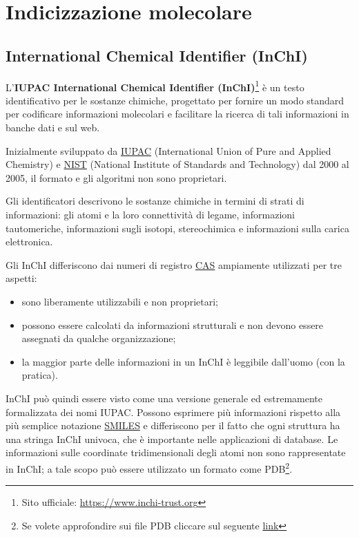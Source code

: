 \chapter{Indicizzazione molecolare}

\section{International Chemical Identifier (InChI)}\label{sec:InChI}
L'\textbf{IUPAC International Chemical Identifier (InChI)}\footnote{Sito ufficiale: \url{https://www.inchi-trust.org}} è un testo identificativo per le sostanze chimiche, progettato per fornire un modo standard per codificare informazioni molecolari e facilitare la ricerca di tali informazioni in banche dati e sul web.

Inizialmente sviluppato da \href{https://iupac.org}{IUPAC}  (International Union of Pure and Applied Chemistry) e \href{https://www.nist.gov}{NIST} (National Institute of Standards and Technology) dal 2000 al 2005, il formato e gli algoritmi non sono proprietari.

Gli identificatori descrivono le sostanze chimiche in termini di strati di informazioni: gli atomi e la loro connettività di legame, informazioni tautomeriche, informazioni sugli isotopi, stereochimica e informazioni sulla carica elettronica.

Gli InChI differiscono dai numeri di registro \hyperref[sec:CAS]{CAS} ampiamente utilizzati per tre aspetti:
\begin{itemize}
	\item sono liberamente utilizzabili e non proprietari;
	\item possono essere calcolati da informazioni strutturali e non devono essere assegnati da qualche organizzazione;
	\item la maggior parte delle informazioni in un InChI è leggibile dall'uomo (con la pratica).
\end{itemize}
InChI può quindi essere visto come una versione generale ed estremamente formalizzata dei nomi IUPAC. Possono esprimere più informazioni rispetto alla più semplice notazione \hyperref[sec:smiles]{SMILES} e differiscono per il fatto che ogni struttura ha una stringa InChI univoca, che è importante nelle applicazioni di database. Le informazioni sulle coordinate tridimensionali degli atomi non sono rappresentate in InChI; a tale scopo può essere utilizzato un formato come PDB\footnote{Se volete approfondire sui file PDB cliccare sul seguente \href{https://www.cgl.ucsf.edu/chimera/docs/UsersGuide/tutorials/pdbintro.html}{link}}.

